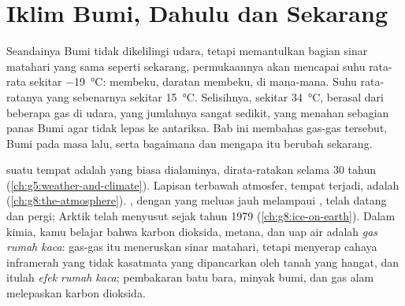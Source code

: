 \chapter{Iklim Bumi, Dahulu dan Sekarang}\label{ch:g9:climate-past-and-present}

Seandainya Bumi tidak dikelilingi udara, tetapi memantulkan bagian sinar
matahari yang sama seperti sekarang, permukaannya akan mencapai suhu
rata-rata sekitar \qty{-19}{\degreeCelsius}:  membeku, daratan
membeku, di mana-mana. Suhu rata-ratanya yang sebenarnya sekitar
\qty{15}{\degreeCelsius}. Selisihnya, sekitar \qty{34}{\degreeCelsius},
berasal dari beberapa gas di udara, yang jumlahnya sangat sedikit, yang
menahan sebagian panas Bumi agar tidak lepas ke antariksa. Bab ini
membahas gas-gas tersebut,  Bumi pada masa lalu, serta bagaimana dan
mengapa  itu berubah sekarang.

\begin{recall}
 suatu tempat adalah  yang biasa dialaminya, dirata-ratakan
selama 30 tahun (\cref{ch:g5:weather-and-climate}). Lapisan terbawah
atmosfer, tempat  terjadi, adalah 
(\cref{ch:g8:the-atmosphere}). , dengan  yang meluas
jauh melampaui , telah datang dan pergi;  Arktik telah
menyusut sejak tahun 1979 (\cref{ch:g8:ice-on-earth}). Dalam kimia, kamu
belajar bahwa karbon dioksida, metana, dan uap air adalah \emph{gas rumah
kaca}: gas-gas itu meneruskan sinar matahari, tetapi menyerap cahaya
inframerah yang tidak kasatmata yang dipancarkan oleh tanah yang hangat,
dan itulah \emph{efek rumah kaca}; pembakaran batu bara, minyak bumi, dan
gas alam melepaskan karbon dioksida.
\end{recall}

